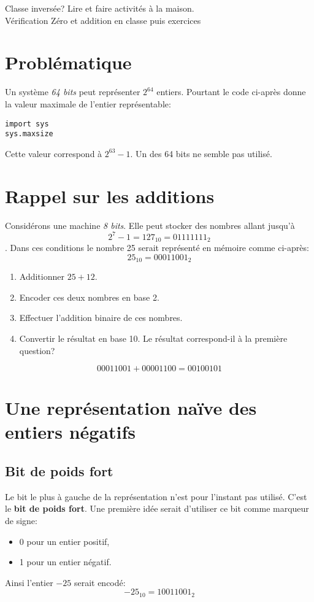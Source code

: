 \documentclass[a4paper,11pt]{article}
\begin{document}
\begin{Form}
\begin{commentprof}
Classe inversée? Lire et faire activités à la maison. \\
Vérification Zéro et addition en classe puis exercices
\end{commentprof}
\section{Problématique}
Un système \emph{64 bits} peut représenter $2^{64}$ entiers. Pourtant le code ci-après donne la valeur maximale de l'entier représentable:
\begin{lstlisting}
import sys
sys.maxsize
\end{lstlisting}
Cette valeur correspond à $2^{63}-1$. Un des 64 bits ne semble pas utilisé.
\begin{center}
\end{center}
\section{Rappel sur les additions}
Considérons une machine \emph{8 bits}. Elle peut stocker des nombres allant jusqu'à $$2^7-1 = 127_{10} = 01111111_2$$. Dans ces conditions le nombre 25 serait représenté en mémoire comme ci-après:
$$25_{10} = 00011001_2$$
\begin{activite}
\begin{enumerate}
\item Additionner $25+12$.
\item Encoder ces deux nombres en base 2.
\item Effectuer l'addition binaire de ces nombres.
\item Convertir le résultat en base 10. Le résultat correspond-il à la première question?
\end{enumerate}
\end{activite}
\begin{commentprof}
$$00011001 + 00001100 = 00100101$$
\end{commentprof}
\section{Une représentation naïve des entiers négatifs}
\subsection{Bit de poids fort}
Le bit le plus à gauche de la représentation n'est pour l'instant pas utilisé. C'est le \textbf{bit de poids fort}. Une première idée serait d'utiliser ce bit comme marqueur de signe:
\begin{itemize}
\item 0 pour un entier positif,
\item 1 pour un entier négatif.
\end{itemize}
Ainsi l'entier $-25$ serait encodé:
$$-25_{10} = 10011001_2$$

\end{Form}
\end{document}
